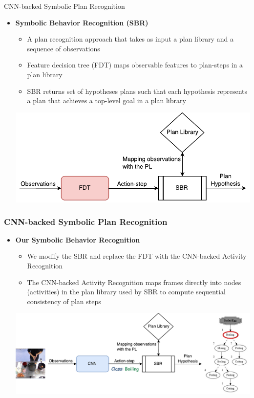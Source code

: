 \documentclass[usenames,dvipsnames]{beamer}
\begin{document}
\begin{frame}{CNN-backed Symbolic Plan Recognition}
   	\begin{itemize}
   		\item \textbf{Symbolic Behavior Recognition (SBR)}
   		\begin{itemize}
				\item A plan recognition approach that takes as input a plan library and a sequence of observations
                \item Feature decision tree (FDT) maps observable features to plan-steps in a plan library
                \item SBR returns set of hypotheses plans such that each hypothesis represents a plan that achieves a top-level goal in a plan library
	    \end{itemize}
		\begin{center}
			\includegraphics[width=0.7\linewidth]{fig/fdt.pdf}
		\end{center}
	\end{itemize}
\end{frame}

\begin{frame}[c]\frametitle{CNN-backed Symbolic Plan Recognition}
   	\begin{itemize}
   		\item \textbf{Our Symbolic Behavior Recognition}
   		\begin{itemize}
				\item We modify the SBR and replace the FDT with the CNN-backed Activity Recognition
                \item The CNN-backed Activity Recognition maps frames directly into nodes (activities) in the plan library used by SBR to compute sequential consistency of plan steps
	    \end{itemize}
		\begin{center}
			\includegraphics[width=0.9\linewidth]{fig/sbr.pdf}
		\end{center}
	\end{itemize}
\end{frame}
\fi
\end{document}
